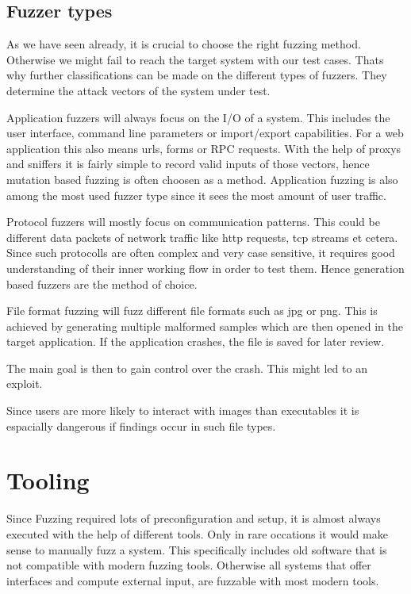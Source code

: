 \documentclass[journal=tosc,final]{iacrtrans}
\begin{document}
\subsection{Fuzzer types}
As we have seen already, it is crucial to choose the right fuzzing method. Otherwise we might fail to reach the target system with our test cases. Thats why further classifications can be made on the different types of fuzzers. They determine the attack vectors of the system under test. 

Application fuzzers will always focus on the I/O of a system. This includes the user interface, command line parameters or import/export capabilities. For a web application this also means urls, forms or RPC requests. With the help of proxys and sniffers it is fairly simple to record valid inputs of those vectors, hence mutation based fuzzing is often choosen as a method. Application fuzzing  is also among the most used fuzzer type since it sees the most amount of user traffic.

Protocol fuzzers will mostly focus on communication patterns. This could be different data packets of network traffic like http requests, tcp streams et cetera. Since such protocolls are often complex and very case sensitive, it requires good understanding of their inner working flow in order to test them. Hence generation based fuzzers are the method of choice.

File format fuzzing will fuzz different file formats such as jpg or png. This is achieved by generating multiple malformed samples which are then opened in the target application. 
If the application crashes, the file is saved for later review. 

The main goal is then to gain control over the crash. This might led to an exploit.

Since users are more likely to interact with images than executables it is espacially dangerous if findings occur in such file types.
\section{Tooling}
Since Fuzzing required lots of preconfiguration and setup, it is almost always executed with the help of different tools. Only in rare occations it would make sense to manually fuzz a system. This specifically includes old software that is not compatible with modern fuzzing tools. Otherwise all systems that offer interfaces and compute external input, are fuzzable with most modern tools. 
\end{document}
